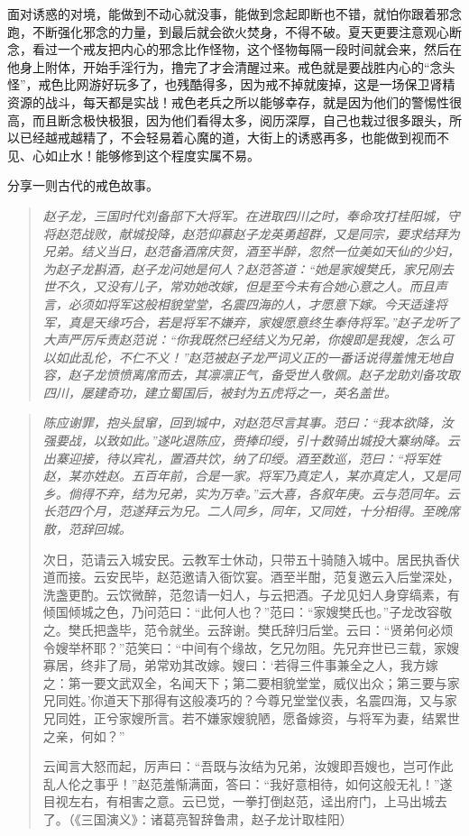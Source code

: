 面对诱惑的对境，能做到不动心就没事，能做到念起即断也不错，就怕你跟着邪念跑，不断强化邪念的力量，到最后就会欲火焚身，不得不破。夏天更要注意观心断念，看过一个戒友把内心的邪念比作怪物，这个怪物每隔一段时间就会来，然后在他身上附体，开始手淫行为，撸完了才会清醒过来。戒色就是要战胜内心的“念头怪”，戒色比网游好玩多了，也残酷得多，因为戒不掉就废掉，这是一场保卫肾精资源的战斗，每天都是实战！戒色老兵之所以能够幸存，就是因为他们的警惕性很高，而且断念极快极狠，因为他们看得太多，阅历深厚，自己也栽过很多跟头，所以已经越戒越精了，不会轻易着心魔的道，大街上的诱惑再多，也能做到视而不见、心如止水！能够修到这个程度实属不易。

分享一则古代的戒色故事。

\begin{quote}\it
    赵子龙，三国时代刘备部下大将军。在进取四川之时，奉命攻打桂阳城，守将赵范战败，献城投降，赵范仰慕赵子龙英勇超群，又是同宗，要求结拜为兄弟。结义当日，赵范备酒席庆贺，酒至半醉，忽然一位美如天仙的少妇，为赵子龙斟酒，赵子龙问她是何人？赵范答道：“她是家嫂樊氏，家兄刚去世不久，又没有儿子，常劝她改嫁，但是至今未有合她心意之人。而且声言，必须如将军这般相貌堂堂，名震四海的人，才愿意下嫁。今天适逢将军，真是天缘巧合，若是将军不嫌弃，家嫂愿意终生奉侍将军。”赵子龙听了大声严厉斥责赵范说：“你我既然已经结义为兄弟，你嫂即是我嫂，怎么可以如此乱伦，不仁不义！”赵范被赵子龙严词义正的一番话说得羞愧无地自容，赵子龙愤愤离席而去，其凛凛正气，备受世人敬佩。赵子龙助刘备攻取四川，屡建奇功，建立蜀国后，被封为五虎将之一，英名盖世。
\end{quote}

\begin{quotation}\it
    陈应谢罪，抱头鼠窜，回到城中，对赵范尽言其事。范曰：“我本欲降，汝强要战，以致如此。”遂叱退陈应，赍捧印绶，引十数骑出城投大寨纳降。云出寨迎接，待以宾礼，置酒共饮，纳了印绶。酒至数巡，范曰：“将军姓赵，某亦姓赵。五百年前，合是一家。将军乃真定人，某亦真定人，又是同乡。倘得不弃，结为兄弟，实为万幸。”云大喜，各叙年庚。云与范同年。云长范四个月，范遂拜云为兄。二人同乡，同年，又同姓，十分相得。至晚席散，范辞回城。

    次日，范请云入城安民。云教军士休动，只带五十骑随入城中。居民执香伏道而接。云安民毕，赵范邀请入衙饮宴。酒至半酣，范复邀云入后堂深处，洗盏更酌。云饮微醉，范忽请一妇人，与云把酒。子龙见妇人身穿缟素，有倾国倾城之色，乃问范曰：“此何人也？”范曰：“家嫂樊氏也。”子龙改容敬之。樊氏把盏毕，范令就坐。云辞谢。樊氏辞归后堂。云曰：“贤弟何必烦令嫂举杯耶？”范笑曰：“中间有个缘故，乞兄勿阻。先兄弃世已三载，家嫂寡居，终非了局，弟常劝其改嫁。嫂曰：‘若得三件事兼全之人，我方嫁之：第一要文武双全，名闻天下；第二要相貌堂堂，威仪出众；第三要与家兄同姓。’你道天下那得有这般凑巧的？今尊兄堂堂仪表，名震四海，又与家兄同姓，正兮家嫂所言。若不嫌家嫂貌陋，愿备嫁资，与将军为妻，结累世之亲，何如？”

    云闻言大怒而起，厉声曰：“吾既与汝结为兄弟，汝嫂即吾嫂也，岂可作此乱人伦之事乎！”赵范羞惭满面，答曰：“我好意相待，如何这般无礼！”遂目视左右，有相害之意。云已觉，一拳打倒赵范，迳出府门，上马出城去了。（《三国演义》：诸葛亮智辞鲁肃，赵子龙计取桂阳）
\end{quotation}

